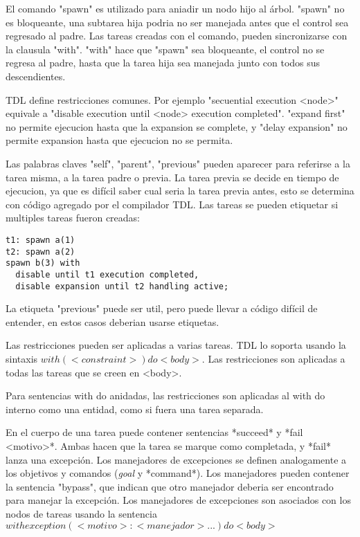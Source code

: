 \documentclass[a4paper, 11pt, oneside]{article}
\begin{document}
El comando "spawn" es utilizado para aniadir un nodo hijo al árbol. "spawn" 
no es bloqueante, una subtarea hija podria no ser
manejada antes que el control sea regresado al padre.
Las tareas creadas con el comando, pueden sincronizarse con la clausula "with".
 "with" hace que "spawn" sea bloqueante,
el control no se regresa al padre, hasta que la tarea hija sea manejada junto 
con todos sus descendientes.

TDL define restricciones comunes. Por ejemplo "secuential execution <node>"
equivale a "disable execution until <node> execution completed".
"expand first" no permite ejecucion hasta que la expansion se complete, y 
"delay expansion" no permite expansion hasta que ejecucion no se permita.

Las palabras claves "self", "parent", "previous" pueden aparecer
para referirse a la tarea misma, a la tarea padre o previa.
La tarea previa se decide en tiempo de ejecucion, ya que es difícil
saber cual seria la tarea previa antes, esto se determina con código agregado
por el compilador TDL.
Las tareas se pueden etiquetar si multiples tareas fueron creadas:

\begin{verbatim}
t1: spawn a(1)
t2: spawn a(2)
spawn b(3) with
  disable until t1 execution completed,
  disable expansion until t2 handling active;
\end{verbatim}

La etiqueta "previous" puede ser util, pero puede llevar a código difícil de 
entender, en estos casos deberian usarse etiquetas.

Las restricciones pueden ser aplicadas a varias tareas. TDL lo soporta
usando la sintaxis $with (<constraint>) do {<body>}$.
Las restricciones son aplicadas a todas las tareas que se creen en <body>.

Para sentencias with do anidadas, las restricciones son aplicadas al 
with do interno como una entidad, como si fuera una tarea separada.

En el cuerpo de una tarea puede contener sentencias *succeed* y 
*fail <motivo>*.
Ambas hacen que la tarea se marque como completada, y *fail* lanza una 
excepción.
Los manejadores de excepciones se definen analogamente a los objetivos y 
comandos (\emph{goal} y *command*).
Los manejadores pueden contener la sentencia "bypass", que indican que otro
manejador deberia ser encontrado para manejar la excepción.
Los manejadores de excepciones son asociados con los nodos de tareas usando
la sentencia $with exception (<motivo>:<manejador> ...) do {<body>}$
\end{document}
